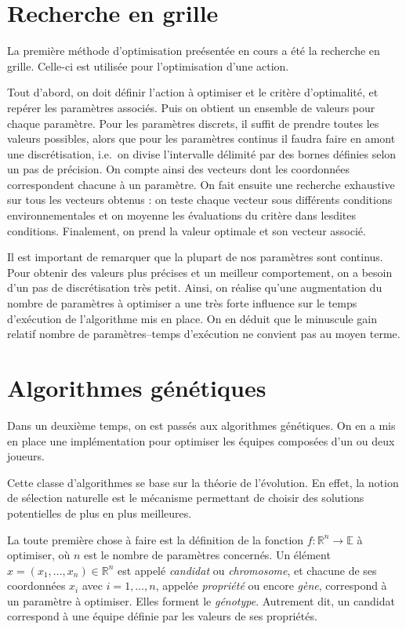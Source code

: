 \documentclass[12pt,a4paper]{article}
\begin{document}
\section{Recherche en grille}
La premi\`ere m\'ethode d'optimisation pre\'esent\'ee en cours a \'et\'e la 
recherche en grille. Celle-ci est utilis\'ee pour l'optimisation d'une 
action.

Tout d'abord, on doit d\'efinir l'action \`a optimiser et le crit\`ere 
d'optimalit\'e, et rep\'erer les param\`etres associ\'es. Puis on 
obtient un ensemble de valeurs pour chaque param\`etre. 
Pour les param\`etres discrets, il suffit de prendre toutes les valeurs 
possibles, alors que pour les param\`etres continus il faudra faire en amont 
une discr\'etisation, i.e.\ on divise l'intervalle d\'elimit\'e par des bornes 
d\'efinies selon un pas de pr\'ecision. On compte ainsi des vecteurs dont les 
coordonn\'ees correspondent chacune \`a un param\`etre. On fait ensuite une 
recherche exhaustive sur tous les vecteurs obtenus : on teste chaque vecteur 
sous diff\'erents conditions environnementales et on moyenne les \'evaluations 
 du crit\`ere dans lesdites conditions. Finalement, on prend la valeur optimale 
et son vecteur associ\'e.

Il est important de remarquer que la plupart de nos param\`etres sont continus. 
Pour obtenir des valeurs plus pr\'ecises et un meilleur comportement, on a 
besoin d'un pas de discr\'etisation tr\`es petit. Ainsi, on r\'ealise qu'une 
augmentation du nombre de param\`etres \`a optimiser a une tr\`es forte 
influence sur le temps d'ex\'ecution de l'algorithme mis en place. On en 
d\'eduit que le minuscule gain relatif nombre de param\`etres--temps 
d'ex\'ecution ne convient pas au moyen terme.

\section{Algorithmes g\'en\'etiques}
Dans un deuxi\`eme temps, on est pass\'es aux algorithmes g\'en\'etiques. On en 
a mis en place une impl\'ementation pour optimiser les \'equipes compos\'ees 
d'un ou deux joueurs.

Cette classe d'algorithmes se base sur la th\'eorie de l'\'evolution. En effet, 
la notion de s\'election naturelle est le m\'ecanisme permettant de choisir des 
solutions potentielles de plus en plus meilleures.

La toute premi\`ere chose \`a faire est la d\'efinition de la fonction 
$f: \mathbb{R}^n \to \mathbb{E}$ \`a optimiser, o\`u $n$ est le nombre de 
param\`etres concern\'es. Un \'el\'ement $x=(x_1,\dotsc,x_n) \in \mathbb{R}^n$ 
est appel\'e {\itshape candidat} ou {\itshape chromosome}, et chacune de ses 
coordonn\'ees $x_i$ avec $i=1,\dotsc,n$, appel\'ee {\itshape propri\'et\'e} 
ou encore {\itshape g\`ene}, correspond \`a un param\`etre \`a optimiser. Elles 
forment le {\itshape g\'enotype}.
Autrement dit, un candidat correspond \`a une \'equipe d\'efinie par les valeurs
de ses propri\'et\'es.
\end{document}
